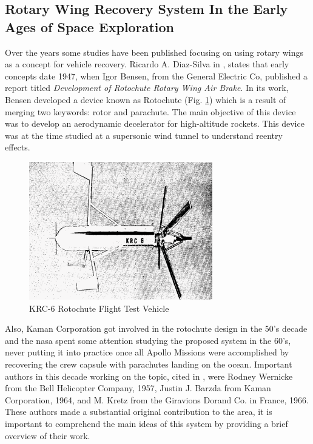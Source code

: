 \subsection{Rotary Wing Recovery System In the Early Ages of Space Exploration}

Over the years some studies have been published focusing on using rotary wings as a concept for vehicle recovery. Ricardo A. Diaz-Silva in \cite{diaz-silva_rotary_2013}, states that early concepts date 1947, when Igor Bensen, from the General Electric Co, published a report titled \textit{Development of Rotochute Rotary Wing Air Brake}. In its work, Bensen developed a device known as Rotochute (Fig. \ref{fig:rotochute_prototype}) which is a result of merging two keywords: rotor and parachute. The main objective of this device was to develop an aerodynamic decelerator for high-altitude rockets. This device was at the time studied at a supersonic wind tunnel to understand reentry effects. 

\begin{figure}[!htb]
    \centering
    \includegraphics[width=8cm]{Figures/introduction/rotochute_prototype.eps}
    \caption{KRC-6 Rotochute Flight Test Vehicle}
    \label{fig:rotochute_prototype}
\end{figure}

Also, Kaman Corporation \cite{noauthor_kaman_nodate} got involved in the rotochute design in the 50's decade and the \gls{nasa} spent some attention studying the proposed system in the 60's, never putting it into practice once all Apollo Missions \cite{noauthor_apollo_nodate} were accomplished by recovering the crew capsule with parachutes landing on the ocean. Important authors in this decade working on the topic, cited in \cite{diaz-silva_rotary_2013}, were Rodney Wernicke from the Bell Helicopter Company, 1957, Justin J. Barzda from Kaman Corporation, 1964, and M. Kretz from the Giravions Dorand Co. in France, 1966. These authors made a substantial original contribution to the area, it is important to comprehend the main ideas of this system by providing a brief overview of their work.

